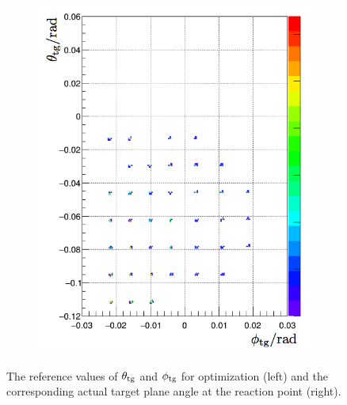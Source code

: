 \begin{figure}[tb!]
\begin{subfigure}[t]{0.45\textwidth}
    \includegraphics[width=\textwidth]{figs/initial-angle-simulation.png}
  \end{subfigure}
  \caption[Reference values for angular optimization.]{The reference values of $\theta_{\mathrm{tg}}$ and $\phi_{\mathrm{tg}}$ for optimization (left) and the corresponding actual target plane angle at the reaction point (right). \label{C6S3F2}}
\end{figure}

